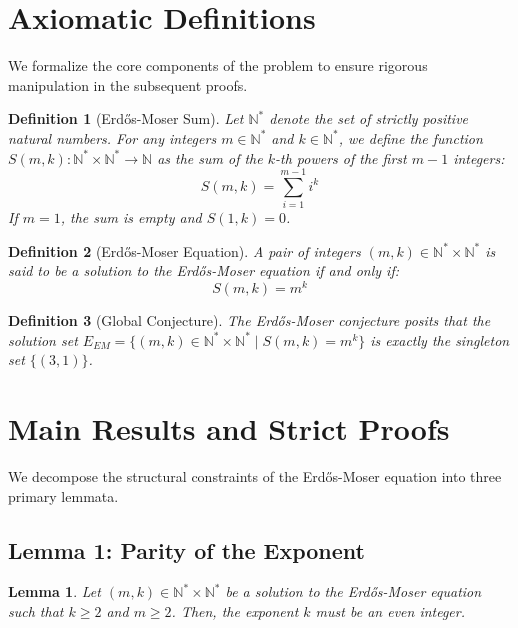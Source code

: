 \documentclass[11pt,a4paper]{article}
\newtheorem{lemma}{Lemma}
\newtheorem{definition}{Definition}
\begin{document}
\section{Axiomatic Definitions}
We formalize the core components of the problem to ensure rigorous manipulation in the subsequent proofs.

\begin{definition}[Erd\H{o}s-Moser Sum]
Let $\mathbb{N}^*$ denote the set of strictly positive natural numbers.
For any integers $m \in \mathbb{N}^*$ and $k \in \mathbb{N}^*$, we define the function $S(m, k) : \mathbb{N}^* \times \mathbb{N}^* \to \mathbb{N}$ as the sum of the $k$-th powers of the first $m-1$ integers:
$$S(m, k) = \sum_{i=1}^{m-1} i^k$$
If $m=1$, the sum is empty and $S(1, k) = 0$.
\end{definition}

\begin{definition}[Erd\H{o}s-Moser Equation]
A pair of integers $(m, k) \in \mathbb{N}^* \times \mathbb{N}^*$ is said to be a solution to the Erd\H{o}s-Moser equation if and only if:
$$S(m, k) = m^k$$
\end{definition}

\begin{definition}[Global Conjecture]
The Erd\H{o}s-Moser conjecture posits that the solution set $E_{EM} = \{ (m, k) \in \mathbb{N}^* \times \mathbb{N}^* \mid S(m, k) = m^k \}$ is exactly the singleton set $\{(3, 1)\}$.
\end{definition}

\section{Main Results and Strict Proofs}
We decompose the structural constraints of the Erd\H{o}s-Moser equation into three primary lemmata.

\subsection{Lemma 1: Parity of the Exponent}

\begin{lemma}
Let $(m, k) \in \mathbb{N}^* \times \mathbb{N}^*$ be a solution to the Erd\H{o}s-Moser equation such that $k \ge 2$ and $m \ge 2$. Then, the exponent $k$ must be an even integer.
\end{lemma}
\end{document}

